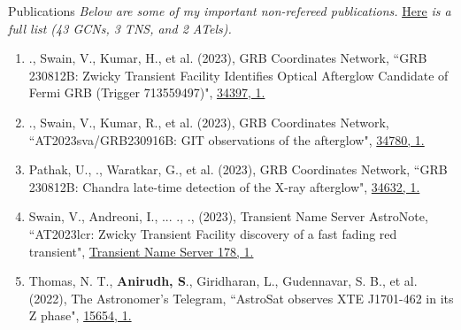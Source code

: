 \begin{rSection}{Publications}
\hspace{-1em} \textit{Below are some of my important non-refereed publications.} \href{https://ui.adsabs.harvard.edu/search/filter_database_fq_database=AND&filter_database_fq_database=database%3A%22astronomy%22&filter_property_fq_property=AND&filter_property_fq_property=property%3A%22notrefereed%22&fq=%7B!type%3Daqp%20v%3D%24fq_database%7D&fq=%7B!type%3Daqp%20v%3D%24fq_property%7D&fq_database=(database%3A%22astronomy%22)&fq_property=(property%3A%22notrefereed%22)&p_=0&q=Anirudh%20Salgundi&sort=date%20desc%2C%20bibcode%20desc}{\underline{Here}} \textit{is a full list (43 GCNs, 3 TNS, and 2 ATels).}
\vspace{-0.5em}
\begin{enumerate}[itemsep=-0.5em, leftmargin=0.5em] %
\item \me., Swain, V., Kumar, H., et al. (2023), GRB Coordinates Network, {``GRB 230812B: Zwicky Transient Facility Identifies Optical Afterglow Candidate of Fermi GRB (Trigger 713559497)"}, \href{https://gcn.nasa.gov/circulars/34397}{34397, 1.}
\item \me., Swain, V., Kumar, R., et al. (2023), GRB Coordinates Network, {``AT2023sva/GRB230916B: GIT observations of the afterglow"}, \href{https://gcn.nasa.gov/circulars/34780}{34780, 1.}
\item Pathak, U., \me., Waratkar, G., et al. (2023), GRB Coordinates Network, {``GRB 230812B: Chandra late-time detection of the X-ray afterglow"}, \href{https://gcn.nasa.gov/circulars/34632}{34632, 1.}
\item Swain, V., Andreoni, I., ... ., \me., (2023), Transient Name Server AstroNote, {``AT2023lcr: Zwicky Transient Facility discovery of a fast fading red transient"}, \href{https://www.wis-tns.org/astronotes/astronote/2023-178}{Transient Name Server 178, 1.}
\item Thomas, N. T., \textbf{Anirudh, S}., Giridharan, L., Gudennavar, S. B., et al. (2022), The Astronomer's Telegram, {``AstroSat observes XTE J1701-462 in its Z phase"}, \href{https://www.astronomerstelegram.org/?read=15654}{15654, 1.}
\end{enumerate}
\end{rSection}
